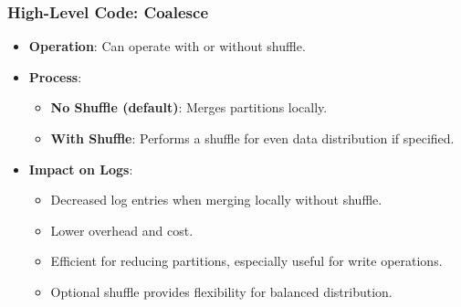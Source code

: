 %
%
%
\begin{frame}
    \frametitle{High-Level Code: Coalesce}

        \begin{itemize}
            \item \textbf{Operation}: Can operate with or without shuffle.
            \item \textbf{Process}:
            \begin{itemize}
                \item \textbf{No Shuffle (default)}: Merges partitions locally.
                \item \textbf{With Shuffle}: Performs a shuffle for even data distribution if specified.
            \end{itemize}
            \item \textbf{Impact on Logs}:
            \begin{itemize}
                \item Decreased log entries when merging locally without shuffle.
                \item Lower overhead and cost.
                \item Efficient for reducing partitions, especially useful for write operations.
                \item Optional shuffle provides flexibility for balanced distribution.
            \end{itemize}
        \end{itemize}
\end{frame}


